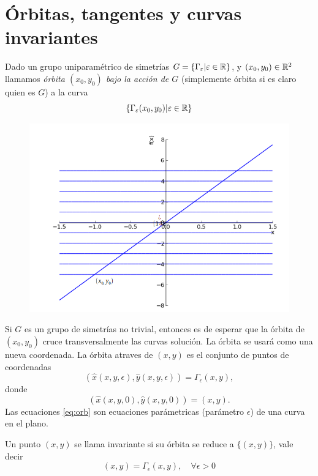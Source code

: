 \section{Órbitas, tangentes y curvas invariantes}


\begin{definicion}[Órbitas] Dado un grupo uniparamétrico de simetrías $G=\{\Gamma_{\varepsilon}|\varepsilon\in\mathbb{R}\}$, y $(x_0,y_0)\in\mathbb{R}^2$ llamamos \emph{órbita $(x_0,y_0)$ bajo la acción de  $G$} (simplemente órbita si es claro quien es $G$) a la curva
\[\{\Gamma_{\varepsilon}(x_0,y_0)|\varepsilon\in\mathbb{R}\} \]
\end{definicion}

\begin{figure}
\includegraphics[scale=.3]{imagenes/sol_trivialB.png}
\end{figure}
Si $G$ es un grupo de simetrías no trivial, entonces es de esperar que la órbita de  $(x_0,y_0)$ cruce transversalmente las curvas solución. La órbita se usará como una nueva coordenada.
 La órbita atraves de $(x,y)$ es el conjunto de puntos de coordenadas
\begin{equation}\label{eq:orb} (\hat{x}(x,y,\epsilon),\hat{y}(x,y,\epsilon))=\Gamma_{\epsilon}(x,y),
\end{equation}
donde
\[(\hat{x}(x,y,0),\hat{y}(x,y,0))=(x,y).\]
Las ecuaciones \eqref{eq:orb} son ecuaciones parámetricas (parámetro $\epsilon$) de una  curva en el plano.

\begin{definicion}
Un punto $(x,y)$ se llama invariante si su órbita se reduce a $\{(x,y)\}$, vale decir
\[(x,y)=\Gamma_{\epsilon}(x,y),\quad\forall \epsilon>0\]
\end{definicion}






